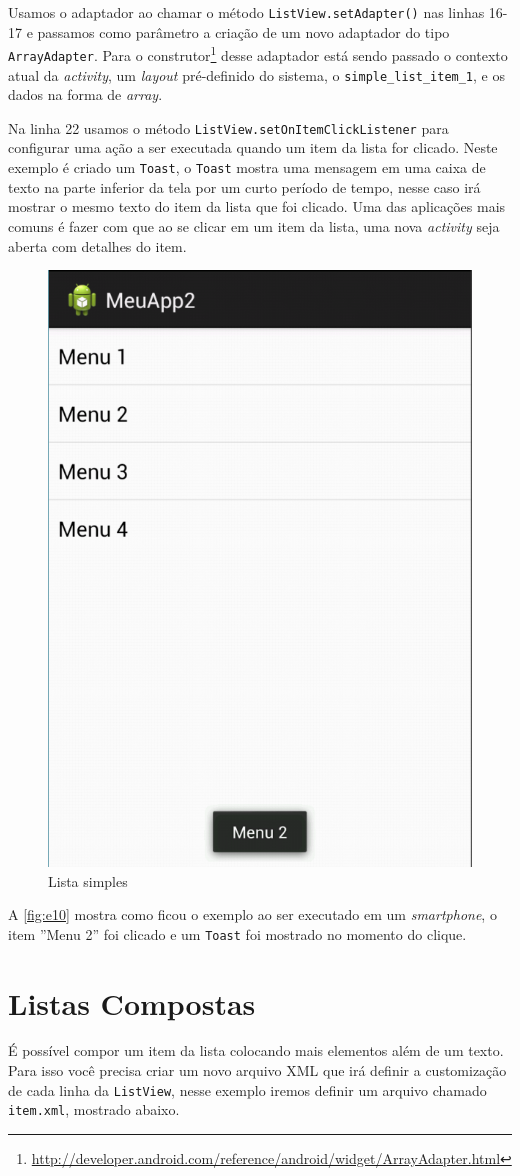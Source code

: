 \documentclass[a4paper,12pt,brazil,oneside]{book}
\begin{document}
Usamos o adaptador ao chamar o método \texttt{ListView.setAdapter()} nas linhas 16-17  e passamos como parâmetro a criação de um novo adaptador do tipo \texttt{ArrayAdapter}. Para o construtor\footnote{\href{http://developer.android.com/reference/android/widget/ArrayAdapter.html}{http://developer.android.com/reference/android/widget/ArrayAdapter.html}} desse adaptador está sendo passado o contexto atual da \emph{activity}, um \emph{layout} pré-definido do sistema, o \texttt{simple\_list\_item\_1}, e os dados na forma de \emph{array}.

Na linha 22 usamos o método \texttt{ListView.setOnItemClickListener} para configurar uma ação a ser executada quando um item da lista for clicado. Neste exemplo é criado um \texttt{Toast}, o \texttt{Toast} mostra uma mensagem em uma caixa de texto na parte inferior da tela por um curto período de tempo, nesse caso irá mostrar o mesmo texto do item da lista que foi clicado. Uma das aplicações mais comuns é fazer com que ao se clicar em um item da lista, uma nova \emph{activity} seja aberta com detalhes do item.

\begin{figure}[H]
  \centering
  \includegraphics[width=.4\textwidth]{figuras/design/lista.png}
  \caption{Lista simples}
  \label{fig:e10}
\end{figure}

A \autoref{fig:e10} mostra como ficou o exemplo ao ser executado em um \emph{smartphone}, o item ''Menu 2'' foi clicado e um \texttt{Toast} foi mostrado no momento do clique.

\section{Listas Compostas}
É possível compor um item da lista colocando mais elementos além de um texto. Para isso você precisa criar um novo arquivo XML que irá definir a customização de cada linha da \texttt{ListView}, nesse exemplo iremos definir um arquivo chamado \texttt{item.xml}, mostrado abaixo.
\end{document}
